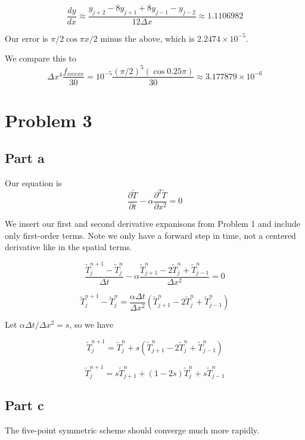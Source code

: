 \documentclass[11pt]{article} %
\begin{document}
\[ \frac{dy}{dx} \approx \frac{y_{j+2} - 8 y_{j+1} + 8 y_{j-1} - y_{j-2}}{12 \Delta x} \approx 1.1106982  \]

Our error is $\pi/2 \cos \pi x/2$ minus the above, which is $2.2474 \times 10^{-5}$.

We compare this to 
\[ \Delta x^4 \frac{f_{xxxxx}}{30} = 10^{-5} \frac{(\pi/2)^5 (\cos 0.25 \pi)}{30} \approx 3.177879 \times 10^{-6}\]

\section{Problem 3}

\subsection{Part a}
Our equation is
\[ \frac{\partial \widetilde{T}}{\partial t} - \alpha \frac{\partial^2 \widetilde{T}}{\partial x^2} = 0 \]

We insert our first and second derivative expanisons from Problem 1 and include only first-order terms. Note we only have a forward step in time, not a centered derivative like in the spatial terms. 

\[ \frac{\widetilde{T}^{n+1}_j - \widetilde{T}^n_j}{\Delta t} - \alpha  \frac{\widetilde{T}^n_{j+1} - 2 \widetilde{T}^n_j + \widetilde{T}^n_{j-1}}{\Delta x^2} = 0 \]

\[ \widetilde{T}^{n+1}_j - \widetilde{T}^n_j = \frac{\alpha \Delta t}{\Delta x^2} \left({\widetilde{T}^n_{j+1} - 2 \widetilde{T}^n_j + \widetilde{T}^n_{j-1}}\right) \]

Let $\alpha \Delta t/\Delta x^2 = s$, so we have

\[ \widetilde{T}^{n+1}_j = \widetilde{T}^n_j + s \left({\widetilde{T}^n_{j+1} - 2 \widetilde{T}^n_j + \widetilde{T}^n_{j-1}}\right) \]

\[ \widetilde{T}^{n+1}_j =  s\widetilde{T}^n_{j+1}+ (1 - 2s) \widetilde{T}^n_j + s \widetilde{T}^n_{j-1} \]

\subsection{Part c}
The five-point symmetric scheme should converge much more rapidly. 
\end{document}
